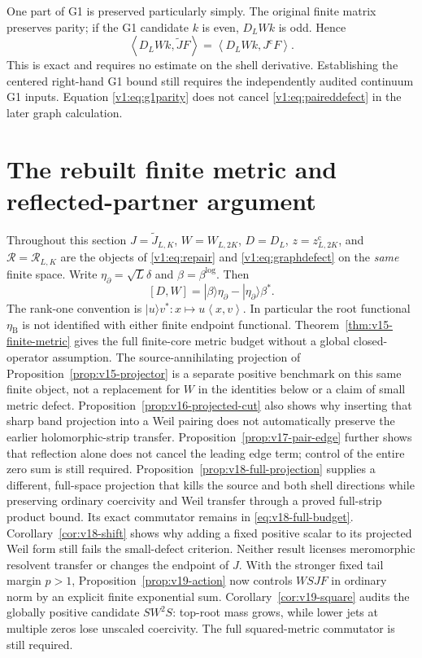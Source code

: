 \documentclass[11pt]{article}
\theoremstyle{remark}
\newcommand{\ip}[2]{\left\langle #1,#2\right\rangle}
\newcommand{\Jc}{J^{\mathrm c}}
\newcommand{\Jr}{\widetilde J}
\begin{document}
One part of G1 is preserved particularly simply. The original finite matrix
preserves parity; if the G1 candidate $k$ is even, $D_LWk$ is odd. Hence
\begin{equation}\label{v1:eq:g1parity}
 \ip{D_LWk}{\Jr F}=\ip{D_LWk}{\Jc F}.
\end{equation}
This is exact and requires no estimate on the shell derivative. Establishing
the centered right-hand G1 bound still requires the independently audited
continuum G1 inputs. Equation \eqref{v1:eq:g1parity} does not cancel
\eqref{v1:eq:paireddefect} in the later graph calculation.

\section{The rebuilt finite metric and reflected-partner argument}\label{sec:g2}
Throughout this section $J=\Jr_{L,K}$, $W=W_{L,2K}$, $D=D_L$,
$z=z^{\mathrm c}_{L,2K}$, and $\mathcal R=\mathcal R_{L,K}$ are the
objects of \eqref{v1:eq:repair} and \eqref{v1:eq:graphdefect} on the
\emph{same} finite space. Write $\eta_\partial=\sqrt L\delta$ and
$\beta=\beta^{\log}$. Then
\[
 [D,W]=|\beta\rangle\eta_\partial-|\eta_\partial\rangle\beta^*.
\]
The rank-one convention is $|u\rangle v^*:x\mapsto u\ip{x}{v}$.
In particular the root functional $\eta_{\mathrm B}$ is not identified
with either finite endpoint functional.
Theorem~\ref{thm:v15-finite-metric} gives the full finite-core metric
budget without a global closed-operator assumption. The source-annihilating
projection of Proposition~\ref{prop:v15-projector} is a separate positive
benchmark on this same finite object, not a replacement for $W$ in the
identities below or a claim of small metric defect. Proposition~\ref{prop:v16-projected-cut}
also shows why inserting that sharp band projection into a Weil pairing
does not automatically preserve the earlier holomorphic-strip transfer.
Proposition~\ref{prop:v17-pair-edge} further shows that reflection alone
does not cancel the leading edge term; control of the entire zero sum is
still required.
Proposition~\ref{prop:v18-full-projection} supplies a different,
full-space projection that kills the source and both shell directions
while preserving ordinary coercivity and Weil transfer through a proved
full-strip product bound. Its exact commutator remains in
\eqref{eq:v18-full-budget}. Corollary~\ref{cor:v18-shift} shows why
adding a fixed positive scalar to its projected Weil form still fails
the small-defect criterion. Neither result licenses meromorphic
resolvent transfer or changes the endpoint of $J$.
With the stronger fixed tail margin $p>1$,
Proposition~\ref{prop:v19-action} now controls $WSJF$ in ordinary norm
by an explicit finite exponential sum. Corollary~\ref{cor:v19-square}
audits the globally positive candidate $SW^2S$: top-root mass grows,
while lower jets at multiple zeros lose unscaled coercivity. The full
squared-metric commutator is still required.
\end{document}
